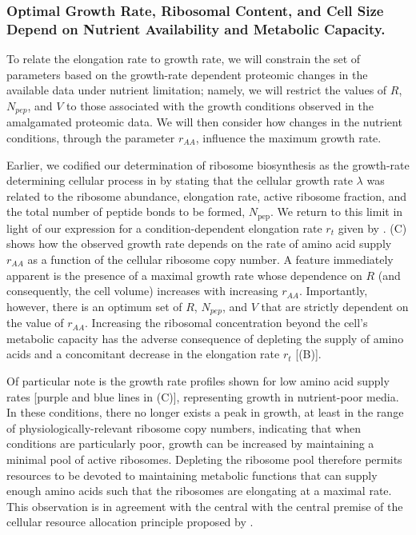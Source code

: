 {\subsubsection{Optimal Growth Rate, Ribosomal Content, and Cell Size Depend on Nutrient
Availability and Metabolic Capacity.}

To relate the elongation rate to growth rate, we will constrain  the set of parameters based
on the growth-rate dependent proteomic changes in the available data under
nutrient limitation;  namely, we will restrict the values of $R$, $N_{pep}$, and
$V$ to those associated with the growth conditions observed in the amalgamated 
proteomic data. We will then consider how changes in the nutrient conditions, through the parameter
$r_{AA}$, influence the maximum growth rate. 

Earlier, we codified our determination of ribosome biosynthesis as the
growth-rate determining cellular process in  by stating that
the cellular growth rate $\lambda$ was related to the ribosome abundance,
elongation rate, active ribosome fraction, and the total number of peptide
bonds to be formed, $N_\text{pep}$. We return to this limit in light of our
expression for a condition-dependent elongation rate $r_t$ given by
. (C) shows how the observed growth
rate depends on the rate of amino acid supply $r_{AA}$ as a function of the
cellular ribosome copy number. A feature immediately apparent is the presence
of a maximal growth rate whose dependence on $R$ (and consequently, the cell
volume) increases with increasing
$r_{AA}$. Importantly, however, there is an optimum set of $R$, $N_{pep}$, and
$V$ that are strictly dependent on the value of $r_{AA}$. Increasing the
ribosomal concentration beyond the cell's metabolic capacity has the adverse
consequence of depleting the supply of amino acids and a concomitant decrease
in the elongation rate $r_t$ [(B)].

Of particular note is the growth rate profiles shown for low amino acid supply
rates [purple and blue lines in (C)], representing
growth in nutrient-poor media. In these conditions, there no longer exists a
peak in growth, at least in the range of physiologically-relevant  ribosome copy
numbers, indicating that when conditions are particularly poor, growth can be
increased by maintaining a minimal pool of active ribosomes. Depleting the
ribosome pool therefore permits resources to be devoted to maintaining metabolic
functions that can supply enough amino acids such that the ribosomes are
elongating at a maximal rate. This observation is in agreement with the central
with the central premise of the cellular resource allocation principle proposed
by \cite{scott2010, klumpp2009,klumpp2014, hui2015}.


}
